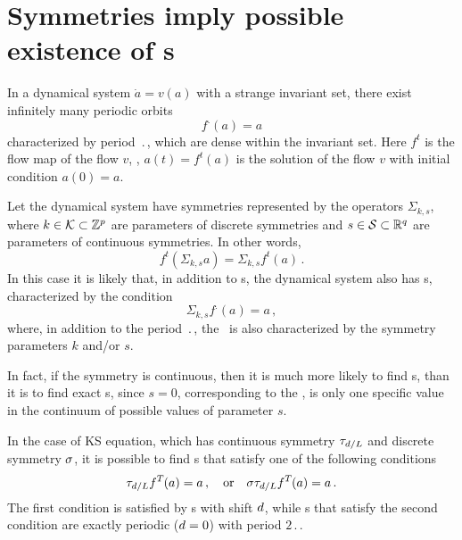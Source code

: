 

\section{Symmetries imply possible existence of \rpo s}
\label{sec:SymRPO}

In a dynamical system $\dot{a} = v(a)$ with a strange
invariant set, there exist infinitely many periodic orbits
\[ f^\period{}(a) = a \]
characterized by period $\period{}$, which are dense within
the invariant set. Here $f^t$ is the flow map of the flow
$v$, \ie, $a(t) = f^t(a)$ is the solution of the flow $v$
with initial condition $a(0) = a$.

Let the dynamical system have symmetries represented by the operators
$\Sigma_{k,s}$, where $k \in {\cal K} \subset \mathbb{Z}^p$ are
parameters of discrete symmetries and $s \in {\cal S} \subset \mathbb{R}^q$
are parameters of continuous symmetries.  In other words,
\[ f^t(\Sigma_{k,s} a) = \Sigma_{k,s} f^t(a)\,. \]
In this case it is likely that, in addition to \po s, the dynamical system also
has \rpo s, characterized by the condition
\[ \Sigma_{k,s}f^\period{}(a) = a\,, \]
where, in addition to the period $\period{}$, the \rpo\ is also characterized by
the symmetry parameters $k$ and/or $s$.

In fact, if the symmetry is continuous, then it is much more likely
to find \rpo s, than it is to find exact \po s, since $s = 0$,
corresponding to the \po , is only one specific value in the
continuum of possible values of parameter $s$.

In the case of KS equation, which has continuous symmetry
$\tau_{d/L}$ and discrete symmetry $\sigma$, it is possible to
find \rpo s that satisfy one of the following conditions
\[
  \tau_{d/L}f^{T_{}}(a) = a\,,
\quad\mbox{or}\quad
  \sigma\tau_{d/L}f^{T_{}}(a) = a\,.
\]
The first condition is satisfied by \rpo s with shift $d$,
while \rpo s that satisfy the second condition are exactly periodic
($d = 0$) with period $2\period{}$.
